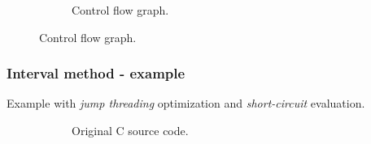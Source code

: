 \documentclass[aspectratio=1610]{beamer}
\begin{document}
\begin{frame}[noframenumbering]
\begin{figure}[htbp]
\begin{subfigure}[b]{0.50\textwidth}
			\caption{Control flow graph.}
		\end{subfigure}
	\end{figure}
\end{frame}

\begin{frame}[noframenumbering]
	\frametitle{Interval method - example}
	Example with \textit{jump threading} optimization and \textit{short-circuit} evaluation.
	\begin{figure}[htbp]
		\centering
		\begin{subfigure}[b]{0.30\textwidth}
			\centering
			
			\caption{Original C source code.}
		\end{subfigure}
		\begin{subfigure}[b]{0.50\textwidth}
			\centering

\end{subfigure}
\end{figure}
\end{frame}
\end{document}
